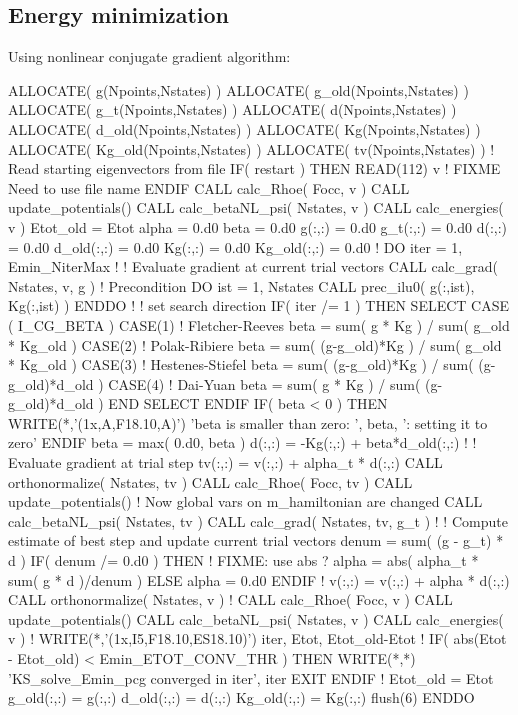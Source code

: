 \subsection{Energy minimization}

Using nonlinear conjugate gradient algorithm:

\begin{fortrancode}
ALLOCATE( g(Npoints,Nstates) )
ALLOCATE( g_old(Npoints,Nstates) )
ALLOCATE( g_t(Npoints,Nstates) )
ALLOCATE( d(Npoints,Nstates) )
ALLOCATE( d_old(Npoints,Nstates) )
ALLOCATE( Kg(Npoints,Nstates) )
ALLOCATE( Kg_old(Npoints,Nstates) )
ALLOCATE( tv(Npoints,Nstates) )
! Read starting eigenvectors from file
IF( restart ) THEN
  READ(112) v   ! FIXME Need to use file name
ENDIF
CALL calc_Rhoe( Focc, v )
CALL update_potentials()
CALL calc_betaNL_psi( Nstates, v )
CALL calc_energies( v )
Etot_old = Etot
alpha = 0.d0
beta  = 0.d0
g(:,:)     = 0.d0
g_t(:,:)   = 0.d0
d(:,:)     = 0.d0
d_old(:,:) = 0.d0
Kg(:,:)    = 0.d0
Kg_old(:,:) = 0.d0
!
DO iter = 1, Emin_NiterMax
  !
  ! Evaluate gradient at current trial vectors
  CALL calc_grad( Nstates, v, g )
  ! Precondition
  DO ist = 1, Nstates
    CALL prec_ilu0( g(:,ist), Kg(:,ist) )
  ENDDO
  !
  ! set search direction
  IF( iter /= 1 ) THEN
    SELECT CASE ( I_CG_BETA )
    CASE(1)
      ! Fletcher-Reeves
      beta = sum( g * Kg ) / sum( g_old * Kg_old )
    CASE(2)
      ! Polak-Ribiere
      beta = sum( (g-g_old)*Kg ) / sum( g_old * Kg_old )
    CASE(3)
      ! Hestenes-Stiefel
      beta = sum( (g-g_old)*Kg ) / sum( (g-g_old)*d_old )
    CASE(4)
      ! Dai-Yuan
      beta = sum( g * Kg ) / sum( (g-g_old)*d_old )
    END SELECT 
  ENDIF
  IF( beta < 0 ) THEN 
    WRITE(*,'(1x,A,F18.10,A)') 'beta is smaller than zero: ', beta, ': setting it to zero'
  ENDIF 
  beta = max( 0.d0, beta )
  d(:,:) = -Kg(:,:) + beta*d_old(:,:)
  !
  ! Evaluate gradient at trial step
  tv(:,:) = v(:,:) + alpha_t * d(:,:)
  CALL orthonormalize( Nstates, tv )
  CALL calc_Rhoe( Focc, tv )
  CALL update_potentials()  ! Now global vars on m_hamiltonian are changed
  CALL calc_betaNL_psi( Nstates, tv )
  CALL calc_grad( Nstates, tv, g_t )
  !
  ! Compute estimate of best step and update current trial vectors
  denum = sum( (g - g_t) * d )
  IF( denum /= 0.d0 ) THEN  ! FIXME: use abs ?
    alpha = abs( alpha_t * sum( g * d )/denum )
  ELSE 
    alpha = 0.d0
  ENDIF
  !
  v(:,:) = v(:,:) + alpha * d(:,:)
  CALL orthonormalize( Nstates, v )
  !
  CALL calc_Rhoe( Focc, v )
  CALL update_potentials()
  CALL calc_betaNL_psi( Nstates, v )
  CALL calc_energies( v )
  !
  WRITE(*,'(1x,I5,F18.10,ES18.10)') iter, Etot, Etot_old-Etot
  !
  IF( abs(Etot - Etot_old) < Emin_ETOT_CONV_THR ) THEN
    WRITE(*,*) 'KS_solve_Emin_pcg converged in iter', iter
    EXIT
  ENDIF
  !
  Etot_old = Etot
  g_old(:,:) = g(:,:)
  d_old(:,:) = d(:,:)
  Kg_old(:,:) = Kg(:,:)
  flush(6)
ENDDO
\end{fortrancode}


